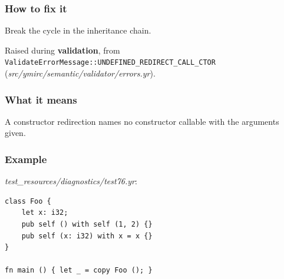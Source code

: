 \subsubsection*{How to fix it}

Break the cycle in the inheritance chain.

\label{sec:codes:e4233}

Raised during \textbf{validation}, from \texttt{ValidateErrorMessage::\allowbreak{}UNDEFINED\_\allowbreak{}REDIRECT\_\allowbreak{}CALL\_\allowbreak{}CTOR} (\textit{src/\allowbreak{}ymirc/\allowbreak{}semantic/\allowbreak{}validator/\allowbreak{}errors.yr}).

\subsubsection*{What it means}

A constructor redirection names no constructor callable with the arguments given.

\subsubsection*{Example}

\textit{test\_\allowbreak{}resources/\allowbreak{}diagnostics/\allowbreak{}test76.yr}:

\begin{lstlisting}[style=coloredverbatimError]
class Foo {
    let x: i32;
    pub self () with self (1, 2) {}
    pub self (x: i32) with x = x {}
}

fn main () { let _ = copy Foo (); }
\end{lstlisting}

